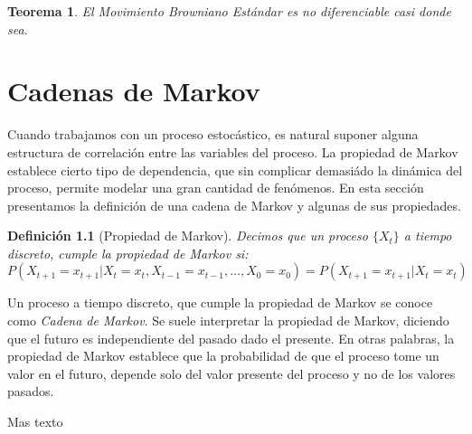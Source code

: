 \documentclass{extreport}
\theoremstyle{definicion}
\newtheorem{definition}{Definición}[chapter]
\theoremstyle{propiedad}
\theoremstyle{teorema}
\newtheorem{teorema}{Teorema}[chapter]
\begin{document}
\begin{teorema}
    El Movimiento Browniano Estándar es no diferenciable casi donde sea.
\end{teorema}

\chapter{Cadenas de Markov}

Cuando trabajamos con un proceso estocástico, es natural suponer alguna estructura de correlación entre las variables del proceso. La propiedad de Markov establece cierto tipo de dependencia, que sin complicar demasiádo la dinámica del proceso, permite modelar una gran cantidad de fenómenos. En esta sección presentamos la definición de una cadena de Markov y algunas de sus propiedades.

\begin{definition}[Propiedad de Markov]
    Decimos que un proceso $\{X_t\}$ a tiempo discreto, cumple la propiedad de Markov si:
    $$
    P(X_{t+1} = x_{t+1}\vert X_t = x_t, X_{t-1} = x_{t-1}, \ldots, X_0 = x_0) = P(X_{t+1} = x_{t+1}\vert X_t = x_t)
    $$
\end{definition}
Un proceso a tiempo discreto, que cumple la propiedad de Markov se conoce como \emph{Cadena de Markov}. Se suele interpretar la propiedad de Markov, diciendo que el futuro es independiente del pasado dado el presente. En otras palabras, la propiedad de Markov establece que la probabilidad de que el proceso tome un valor en el futuro, depende solo del valor presente del proceso y no de los valores pasados.

Mas texto
\end{document}

